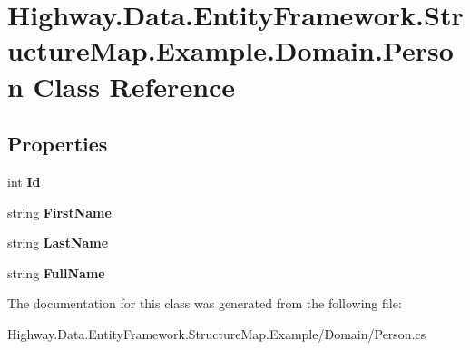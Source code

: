 \hypertarget{class_highway_1_1_data_1_1_entity_framework_1_1_structure_map_1_1_example_1_1_domain_1_1_person}{\section{Highway.\-Data.\-Entity\-Framework.\-Structure\-Map.\-Example.\-Domain.\-Person Class Reference}
\label{class_highway_1_1_data_1_1_entity_framework_1_1_structure_map_1_1_example_1_1_domain_1_1_person}
}
\subsection*{Properties}
\begin{DoxyCompactItemize}
\item 
\hypertarget{class_highway_1_1_data_1_1_entity_framework_1_1_structure_map_1_1_example_1_1_domain_1_1_person_a81b16b0a426c475fbab5dac0017dd5de}{int {\bfseries Id}}\label{class_highway_1_1_data_1_1_entity_framework_1_1_structure_map_1_1_example_1_1_domain_1_1_person_a81b16b0a426c475fbab5dac0017dd5de}

\item 
\hypertarget{class_highway_1_1_data_1_1_entity_framework_1_1_structure_map_1_1_example_1_1_domain_1_1_person_a54be321c15d64f1b7bad676accebbc74}{string {\bfseries First\-Name}}\label{class_highway_1_1_data_1_1_entity_framework_1_1_structure_map_1_1_example_1_1_domain_1_1_person_a54be321c15d64f1b7bad676accebbc74}

\item 
\hypertarget{class_highway_1_1_data_1_1_entity_framework_1_1_structure_map_1_1_example_1_1_domain_1_1_person_ac4a78c53bb41d72d9482731afb77b5f9}{string {\bfseries Last\-Name}}\label{class_highway_1_1_data_1_1_entity_framework_1_1_structure_map_1_1_example_1_1_domain_1_1_person_ac4a78c53bb41d72d9482731afb77b5f9}

\item 
\hypertarget{class_highway_1_1_data_1_1_entity_framework_1_1_structure_map_1_1_example_1_1_domain_1_1_person_a0b564af53d203908833124085ccb0479}{string {\bfseries Full\-Name}}\label{class_highway_1_1_data_1_1_entity_framework_1_1_structure_map_1_1_example_1_1_domain_1_1_person_a0b564af53d203908833124085ccb0479}

\end{DoxyCompactItemize}


The documentation for this class was generated from the following file\-:\begin{DoxyCompactItemize}
\item 
Highway.\-Data.\-Entity\-Framework.\-Structure\-Map.\-Example/\-Domain/Person.\-cs\end{DoxyCompactItemize}
